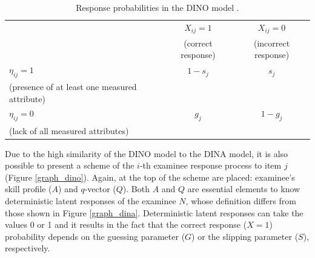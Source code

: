 \documentclass[english]{pwr_wmat_praca_dyplomowa}
\theoremstyle{plain}
\numberwithin{theorem}{chapter}
\theoremstyle{definition}
\numberwithin{theorem}{chapter}
\begin{document}
	\begin{table}[H]
		\centering
		\begin{tabular}{l c c} 
			\hline
			{\rule{0pt}{3ex}} & $X_{ij} = 1$ & $X_{ij} = 0$ \\
			& (correct response) & (incorrect response) \\ [0.5ex]
			\hline 
			{\rule{0pt}{3ex}} $\eta_{ij} = 1$ & $1- s_j$ & $s_j$ \\ 
			(presence of at least one measured attribute) & & \\[1ex] 
			$\eta_{ij} = 0$ & $g_j$ & $1-g_j$ \\ 
			(lack of all measured attributes) & & \\[0.5ex] 
			\hline
		\end{tabular}
		\caption{Response probabilities in the DINO model \cite{book_tables}.}
		\label{tab:response_prob2} 
	\end{table}
	
	Due to the high similarity of the DINO model to the DINA model, it is also possible to present a scheme of the $i$-th examinee response process to item $j$ (Figure \ref{graph_dino}). Again, at the top of the scheme are placed: examinee's skill profile ($A$) and $q$-vector ($Q$). Both $A$ and $Q$ are essential elements to know deterministic latent responses of the examinee $N$, whose definition differs from those shown in Figure \ref{graph_dina}. Deterministic latent responses can take the values 0 or 1 and it results in the fact that the correct response ($X=1$) probability depends on the guessing parameter ($G$) or the slipping parameter ($S$), respectively.
	
\end{document}

